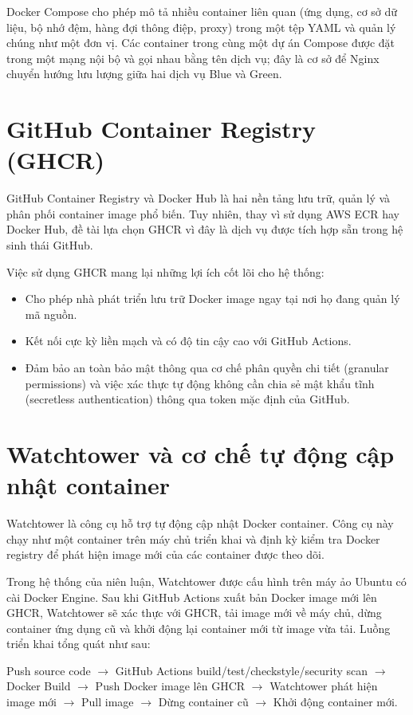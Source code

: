 \documentclass[12pt,a4paper,oneside]{extreport}
\begin{document}
Docker Compose cho phép mô tả nhiều container liên quan (ứng dụng, cơ sở dữ
liệu, bộ nhớ đệm, hàng đợi thông điệp, proxy) trong một tệp YAML và quản lý
chúng như một đơn vị. Các container trong cùng một dự án Compose được đặt trong
một mạng nội bộ và gọi nhau bằng tên dịch vụ; đây là cơ sở để Nginx chuyển
hướng lưu lượng giữa hai dịch vụ Blue và Green.

\section{GitHub Container Registry (GHCR)}
GitHub Container Registry và Docker Hub là hai nền tảng lưu trữ, quản lý và
phân phối container image phổ biến. Tuy nhiên, thay vì sử dụng AWS ECR hay
Docker Hub, đề tài lựa chọn GHCR vì đây là dịch vụ được tích hợp sẵn trong hệ
sinh thái GitHub.

Việc sử dụng GHCR mang lại những lợi ích cốt lõi cho hệ thống:
\begin{itemize}
  \item Cho phép nhà phát triển lưu trữ Docker image ngay tại nơi họ đang quản lý
  mã nguồn.
  \item Kết nối cực kỳ liền mạch và có độ tin cậy cao với GitHub Actions.
  \item Đảm bảo an toàn bảo mật thông qua cơ chế phân quyền chi tiết (granular
  permissions) và việc xác thực tự động không cần chia sẻ mật khẩu tĩnh
  (secretless authentication) thông qua token mặc định của GitHub.
\end{itemize}

\section{Watchtower và cơ chế tự động cập nhật container}
Watchtower là công cụ hỗ trợ tự động cập nhật Docker container. Công cụ này
chạy như một container trên máy chủ triển khai và định kỳ kiểm tra Docker
registry để phát hiện image mới của các container được theo dõi.

Trong hệ thống của niên luận, Watchtower được cấu hình trên máy ảo Ubuntu có cài
Docker Engine. Sau khi GitHub Actions xuất bản Docker image mới lên GHCR,
Watchtower sẽ xác thực với GHCR, tải image mới về máy chủ, dừng container ứng
dụng cũ và khởi động lại container mới từ image vừa tải. Luồng triển khai tổng
quát như sau:

\begin{center}
  \begin{minipage}{0.92\textwidth}
    \raggedright
    Push source code $\rightarrow$ GitHub Actions
    build/test/checkstyle/security scan $\rightarrow$ Docker Build
    $\rightarrow$ Push Docker image lên GHCR $\rightarrow$ Watchtower phát hiện
    image mới $\rightarrow$ Pull image $\rightarrow$ Dừng container cũ
    $\rightarrow$ Khởi động container mới.
  \end{minipage}
\end{center}
\end{document}
